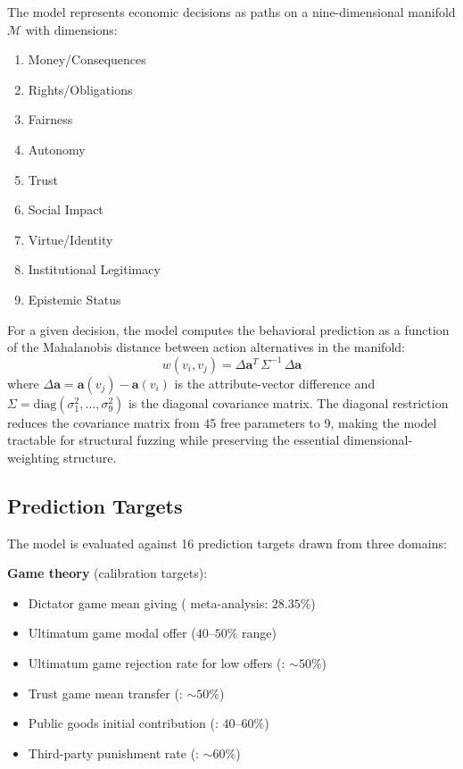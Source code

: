 \documentclass[12pt]{article}
\newcommand{\M}{\mathcal{M}}
\begin{document}
The model represents economic decisions as paths on a nine-dimensional manifold $\M$ with dimensions:
\begin{enumerate}[label=$d_{\arabic*}$:]
    \item Money/Consequences
    \item Rights/Obligations
    \item Fairness
    \item Autonomy
    \item Trust
    \item Social Impact
    \item Virtue/Identity
    \item Institutional Legitimacy
    \item Epistemic Status
\end{enumerate}

For a given decision, the model computes the behavioral prediction as a function of the Mahalanobis distance between action alternatives in the manifold:
\begin{equation}
    w(v_i, v_j) = \Delta \mathbf{a}^T \, \Sigma^{-1} \, \Delta \mathbf{a}
    \label{eq:mahal}
\end{equation}
where $\Delta \mathbf{a} = \mathbf{a}(v_j) - \mathbf{a}(v_i)$ is the attribute-vector difference and $\Sigma = \mathrm{diag}(\sigma_1^2, \ldots, \sigma_9^2)$ is the diagonal covariance matrix.  The diagonal restriction reduces the covariance matrix from 45 free parameters to 9, making the model tractable for structural fuzzing while preserving the essential dimensional-weighting structure.

\subsection{Prediction Targets}

The model is evaluated against 16 prediction targets drawn from three domains:

\textbf{Game theory} (calibration targets):
\begin{itemize}
    \item Dictator game mean giving (\cite{engel2011} meta-analysis: $28.35\%$)
    \item Ultimatum game modal offer ($40\text{--}50\%$ range)
    \item Ultimatum game rejection rate for low offers (\cite{camerer2003}: $\sim 50\%$)
    \item Trust game mean transfer (\cite{camerer2003}: $\sim 50\%$)
    \item Public goods initial contribution (\cite{fehr1999}: $40\text{--}60\%$)
    \item Third-party punishment rate (\cite{fehr2004}: $\sim 60\%$)
\end{itemize}
\end{document}
